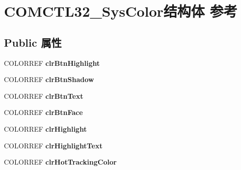 \hypertarget{struct_c_o_m_c_t_l32___sys_color}{}\section{C\+O\+M\+C\+T\+L32\+\_\+\+Sys\+Color结构体 参考}
\label{struct_c_o_m_c_t_l32___sys_color}
\subsection*{Public 属性}
\begin{DoxyCompactItemize}
\item 
\mbox{\label{struct_c_o_m_c_t_l32___sys_color_a7f674fe5270bb72f7fe7e3cb818cbb73}} 
C\+O\+L\+O\+R\+R\+EF {\bfseries clr\+Btn\+Highlight}
\item 
\mbox{\label{struct_c_o_m_c_t_l32___sys_color_a1302bb90cda31a624edf6342118345a1}} 
C\+O\+L\+O\+R\+R\+EF {\bfseries clr\+Btn\+Shadow}
\item 
\mbox{\label{struct_c_o_m_c_t_l32___sys_color_a1b0108d142197ad045bac5887b943a99}} 
C\+O\+L\+O\+R\+R\+EF {\bfseries clr\+Btn\+Text}
\item 
\mbox{\label{struct_c_o_m_c_t_l32___sys_color_a2771319fa1533cd5b43c70440db15cf9}} 
C\+O\+L\+O\+R\+R\+EF {\bfseries clr\+Btn\+Face}
\item 
\mbox{\label{struct_c_o_m_c_t_l32___sys_color_afc260a917215865d70eb49735ad430d5}} 
C\+O\+L\+O\+R\+R\+EF {\bfseries clr\+Highlight}
\item 
\mbox{\label{struct_c_o_m_c_t_l32___sys_color_a002b909db87ad97ae9d69765f5cfb5a5}} 
C\+O\+L\+O\+R\+R\+EF {\bfseries clr\+Highlight\+Text}
\item 
\mbox{\label{struct_c_o_m_c_t_l32___sys_color_acca7631d6943e2c5bff7b581dcd5a1e8}} 
C\+O\+L\+O\+R\+R\+EF {\bfseries clr\+Hot\+Tracking\+Color}
\item 
\mbox{\label{struct_c_o_m_c_t_l32___sys_color_adf115e1414286cadfe30000f87117212}} 

\end{DoxyCompactItemize}
